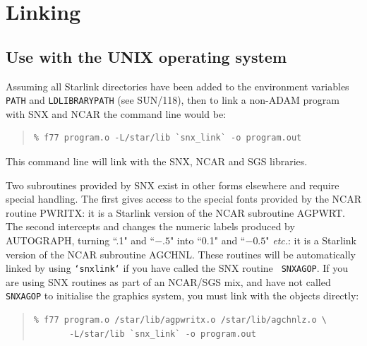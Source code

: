 \documentclass[twoside,11pt]{article}
\renewcommand{\_}{\texttt{\symbol{95}}}
\begin{document}
\section {Linking} \label{link_sect}

\subsection {Use with the UNIX operating system}

\begin{sloppypar} Assuming all Starlink directories have been added to
the environment variables {\tt PATH} and {\tt LD\_LIBRARY\_PATH} (see
SUN/118), then to link a non-ADAM program with SNX and NCAR the command
line would be:  \end{sloppypar}

\begin {quote}
\begin {small}
\begin{verbatim}
% f77 program.o -L/star/lib `snx_link` -o program.out
\end{verbatim}
\end {small}
\end {quote}

This command line will link with the SNX, NCAR and SGS libraries.

Two subroutines provided by SNX exist in other forms elsewhere and
require special handling.  The first gives access to the special fonts
provided by the NCAR routine PWRITX:  it is a Starlink version of the
NCAR subroutine AGPWRT.  The second intercepts and changes the numeric
labels produced by AUTOGRAPH, turning ``.1" and ``$-.5$" into ``0.1"
and ``$-0.5$" {\em etc.}: it is a Starlink version of the NCAR
subroutine AGCHNL.  These routines will be automatically linked by
using {\tt `snx\_link`} if you have called the SNX routine {\tt
SNX\_AGOP}.   If you are using SNX routines as part of an NCAR/SGS mix,
and have not called {\tt SNX\_AGOP} to initialise the graphics system,
you must link with the objects directly:

\begin {quote}
\begin {small}
\begin{verbatim}
% f77 program.o /star/lib/agpwritx.o /star/lib/agchnlz.o \
       -L/star/lib `snx_link` -o program.out
\end{verbatim}
\end {small}
\end {quote}
\end{document}
